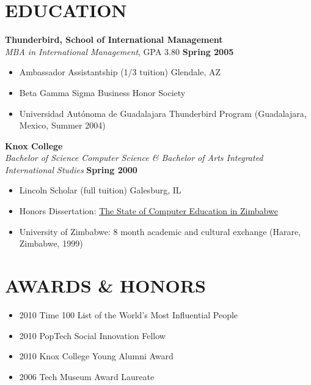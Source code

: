 \documentclass{res}
\begin{document}
\begin{resume}
\section{EDUCATION} 
\vspace{8pt} 
\textbf{Thunderbird, School of International Management}  \\
\emph{MBA in International Management}, GPA 3.80 \hfill \textbf{Spring 2005}
   \begin{itemize} \itemsep -2pt %
		\item Ambassador Assistantship (1/3 tuition)   \hfill Glendale, AZ
		\item Beta Gamma Sigma Business Honor Society
		\item Universidad Autónoma de Guadalajara Thunderbird Program (Guadalajara, Mexico, Summer 2004)  
	\end{itemize} \vspace{-6pt}

	\vspace{8pt} 
	\textbf{Knox College}  \\
	\emph{Bachelor of Science Computer Science \& Bachelor of Arts Integrated International Studies} \hfill \textbf{Spring 2000}
	   \begin{itemize} \itemsep -2pt %
			\item Lincoln Scholar (full tuition)   \hfill Galesburg, IL
			\item Honors Dissertation: \underline{The State of Computer Education in Zimbabwe} 
			\item University of Zimbabwe: 8 month academic and cultural exchange (Harare, Zimbabwe, 1999)
		\end{itemize}


\section{AWARDS \& HONORS}
\begin{itemize} \itemsep -2pt
	\item 2010 Time 100 List of the World's Most Influential People
	\item 2010 PopTech Social Innovation Fellow
        \item 2010 Knox College Young Alumni Award
	\item 2006 Tech Museum Award Laureate
\end{itemize}


\end{resume}
\end{document}
